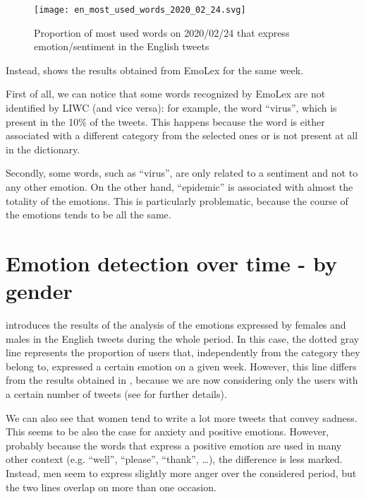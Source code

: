 \begin{figure}[H]
	\centering
    	\texttt{[image: en\_most\_used\_words\_2020\_02\_24.svg]}
    	\caption{Proportion of most used words on 2020/02/24 that express emotion/sentiment in the English tweets}
    	\label{fig:en-most-used-words-2020-02-24}
\end{figure}

Instead,  shows the results obtained from EmoLex for the same week.

First of all, we can notice that some words recognized by EmoLex are not identified by LIWC (and vice versa): for example, the word “virus”, which is present in the 10\% of the tweets. This happens because the word is either associated with a different category from the selected ones or is not present at all in the dictionary.

Secondly, some words, such as “virus”, are only related to a sentiment and not to any other emotion. On the other hand, “epidemic” is associated with almost the totality of the emotions. This is particularly problematic, because the course of the emotions tends to be all the same.

\section{Emotion detection over time - by gender}
\label{sec:emotion-by-gender-results}

 introduces the results of the analysis of the emotions expressed by females and males in the English tweets during the whole period. In this case, the dotted gray line represents the proportion of users that, independently from the category they belong to, expressed a certain emotion on a given week. However, this line differs from the results obtained in , because we are now considering only the users with a certain number of tweets (see  for further details).

We can also see that women tend to write a lot more tweets that convey sadness. This seems to be also the case for anxiety and positive emotions. However, probably because the words that express a positive emotion are used in many other context (e.g. “well”, “please”, “thank”, \ldots), the difference is less marked. Instead, men seem to express slightly more anger over the considered period, but the two lines overlap on more than one occasion.

